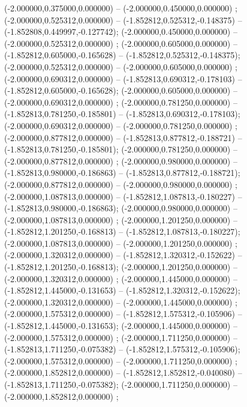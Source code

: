  (-2.000000,0.375000,0.000000) -- (-2.000000,0.450000,0.000000) ;
 (-2.000000,0.525312,0.000000) -- (-1.852812,0.525312,-0.148375) -- (-1.852808,0.449997,-0.127742);
 (-2.000000,0.450000,0.000000) -- (-2.000000,0.525312,0.000000) ;
 (-2.000000,0.605000,0.000000) -- (-1.852812,0.605000,-0.165628) -- (-1.852812,0.525312,-0.148375);
 (-2.000000,0.525312,0.000000) -- (-2.000000,0.605000,0.000000) ;
 (-2.000000,0.690312,0.000000) -- (-1.852813,0.690312,-0.178103) -- (-1.852812,0.605000,-0.165628);
 (-2.000000,0.605000,0.000000) -- (-2.000000,0.690312,0.000000) ;
 (-2.000000,0.781250,0.000000) -- (-1.852813,0.781250,-0.185801) -- (-1.852813,0.690312,-0.178103);
 (-2.000000,0.690312,0.000000) -- (-2.000000,0.781250,0.000000) ;
 (-2.000000,0.877812,0.000000) -- (-1.852813,0.877812,-0.188721) -- (-1.852813,0.781250,-0.185801);
 (-2.000000,0.781250,0.000000) -- (-2.000000,0.877812,0.000000) ;
 (-2.000000,0.980000,0.000000) -- (-1.852813,0.980000,-0.186863) -- (-1.852813,0.877812,-0.188721);
 (-2.000000,0.877812,0.000000) -- (-2.000000,0.980000,0.000000) ;
 (-2.000000,1.087813,0.000000) -- (-1.852812,1.087813,-0.180227) -- (-1.852813,0.980000,-0.186863);
 (-2.000000,0.980000,0.000000) -- (-2.000000,1.087813,0.000000) ;
 (-2.000000,1.201250,0.000000) -- (-1.852812,1.201250,-0.168813) -- (-1.852812,1.087813,-0.180227);
 (-2.000000,1.087813,0.000000) -- (-2.000000,1.201250,0.000000) ;
 (-2.000000,1.320312,0.000000) -- (-1.852812,1.320312,-0.152622) -- (-1.852812,1.201250,-0.168813);
 (-2.000000,1.201250,0.000000) -- (-2.000000,1.320312,0.000000) ;
 (-2.000000,1.445000,0.000000) -- (-1.852812,1.445000,-0.131653) -- (-1.852812,1.320312,-0.152622);
 (-2.000000,1.320312,0.000000) -- (-2.000000,1.445000,0.000000) ;
 (-2.000000,1.575312,0.000000) -- (-1.852812,1.575312,-0.105906) -- (-1.852812,1.445000,-0.131653);
 (-2.000000,1.445000,0.000000) -- (-2.000000,1.575312,0.000000) ;
 (-2.000000,1.711250,0.000000) -- (-1.852813,1.711250,-0.075382) -- (-1.852812,1.575312,-0.105906);
 (-2.000000,1.575312,0.000000) -- (-2.000000,1.711250,0.000000) ;
 (-2.000000,1.852812,0.000000) -- (-1.852812,1.852812,-0.040080) -- (-1.852813,1.711250,-0.075382);
 (-2.000000,1.711250,0.000000) -- (-2.000000,1.852812,0.000000) ;
